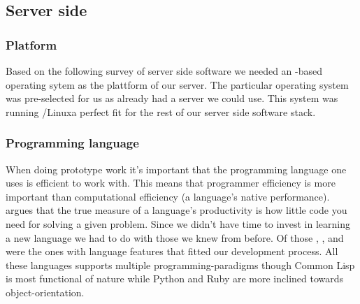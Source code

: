 \subsection{Server side}

\subsubsection{Platform}

Based on the following survey of server side software we needed an
-based operating sytem as the plattform of our server. The
particular operating system was pre-selected for us as  already
had a server we could use. This system was running %
/Linux\dash{}a perfect fit for the rest of our server side
software stack.

\subsubsection{Programming language}
\label{section:selection.stack.server.language}

When doing prototype work it's important that the programming language one
uses is efficient to work with. This means that programmer efficiency is more
important than computational efficiency (a language's native performance).
\citet{mcanally08} argues that the true measure of a language's productivity
is how little code you need for solving a given problem.
Since we didn't have time to invest in learning a new language we had to do
with those we knew from before. Of those ,%
,%
and %
were the ones with language features that fitted our development process.
All these languages supports multiple programming-paradigms though Common
Lisp is most functional of nature  while Python and Ruby are more
inclined towards object-orientation.

